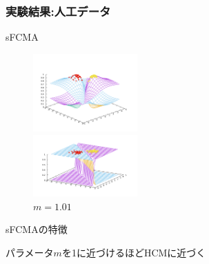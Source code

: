 \documentclass[13pt,dvipdfmx]{beamer}
\begin{document}
\begin{frame}\frametitle{実験結果:人工データ}
  \begin{block}{sFCMA}
    \begin{figure}[htbp]
      \begin{minipage}{0.4\hsize}
        \begin{center}
          \includegraphics[width=40mm]{sFCMA-Em2.png}
        \end{center}
        \captionsetup{labelformat=empty,labelsep=none}
        \caption{$m=2$}
        \label{fig:one}
      \end{minipage}
      \hspace{1cm}
      \begin{minipage}{0.4\hsize}
        \begin{center}
          \includegraphics[width=40mm]{sFCMA-Em11.png}
        \end{center}
        \captionsetup{labelformat=empty,labelsep=none}
        \caption{$m=1.01$}
        \label{fig:two}
      \end{minipage}
    \end{figure}
  \end{block}
  \begin{block}{sFCMAの特徴}
    \begin{center}
      パラメータ$m$を1に近づけるほどHCMに近づく
    \end{center}
  \end{block}
\end{frame}
\end{document}
